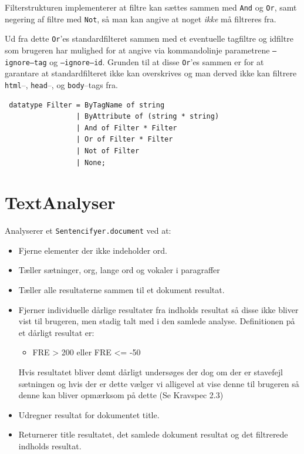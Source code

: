 \documentclass[a4paper,oneside,article]{memoir}
\begin{document}
Filterstrukturen implementerer at filtre kan sættes sammen med
\texttt{And} og \texttt{Or}, samt negering af filtre med \texttt{Not},
så man kan angive at noget \textit{ikke} må filtreres fra.

Ud fra dette \texttt{Or}'es standardfilteret sammen med et eventuelle
tagfiltre og idfiltre som brugeren har mulighed for at angive via
kommandolinje parametrene \texttt{--ignore--tag} og
\texttt{--ignore--id}. Grunden til at disse \texttt{Or}'es sammen er for
at garantare at standardfilteret ikke kan overskrives og man derved
ikke kan filtrere \texttt{html}--, \texttt{head}--, og \texttt{body}--tags fra.

\begin{lstlisting}
 datatype Filter = ByTagName of string
                 | ByAttribute of (string * string)
                 | And of Filter * Filter
                 | Or of Filter * Filter
                 | Not of Filter
                 | None;
\end{lstlisting}

\section{TextAnalyser}
\label{TextAnalyser}

Analyserer et \texttt{Sentencifyer.document} ved at:
\begin{itemize}
 \item Fjerne elementer der ikke indeholder ord.
 \item Tæller sætninger, org, lange ord og vokaler i paragraffer
 \item Tæller alle resultaterne sammen til et dokument resultat.
 \item Fjerner individuelle dårlige resultater fra indholds resultat
   så disse ikke bliver vist til brugeren, men stadig talt med i den
   samlede analyse. Definitionen på et dårligt resultat er:
   \begin{itemize}
   \item FRE > 200 eller FRE <= -50
   \end{itemize}
   Hvis resultatet bliver dømt dårligt undersøges der dog om der er
   stavefejl sætningen og hvis der er dette vælger vi alligevel at
   vise denne til brugeren så denne kan bliver opmærksom på dette (Se
   Kravspec 2.3)
 \item Udregner resultat for dokumentet title.
 \item Returnerer title resultatet, det samlede dokument resultat og det filtrerede indholds resultat.
\end{itemize}
\end{document}
